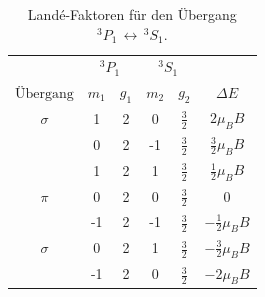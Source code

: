 \begin{table}[h]
        \centering
        \caption{Landé-Faktoren für den Übergang $^{3}P_1 \, \leftrightarrow \, ^{3}S_1$.}
        \label{tab:atab01}
        \begin{tabular}{c c c c c c}
            \toprule
            & \multicolumn{2}{c}{$^{3}P_1 $} & \multicolumn{2}{c}{$^{3}S_1$} \\ %
            \cmidrule(lr){2-3}\cmidrule(lr){4-5}
            {$\text{Übergang}$} & {$m_1$} & {$g_1$} & {$m_2$} & {$g_2$} & {$\Delta E$} \\
            \midrule
            {$\sigma$} & 1 & 2 & 0  & {$\frac{3}{2}$}  & {$2  \mu_B B$} \\
            {}         & 0 & 2 & -1 & {$\frac{3}{2}$}  & {$\frac{3}{2}  \mu_B B$} \\
            \midrule
            {}         & 1  & 2 & 1  & {$\frac{3}{2}$}  & {$\frac{1}{2}  \mu_B B$} \\
            {$\pi$}    & 0  & 2 & 0  & {$\frac{3}{2}$}  & 0 \\
            {}         & -1 & 2 & -1 & {$\frac{3}{2}$}  & {$-\frac{1}{2}  \mu_B B$} \\
            \midrule
            {$\sigma$} & 0  & 2 & 1  & {$\frac{3}{2}$} & {$-\frac{3}{2}  \mu_B B$} \\
            {}         & -1 & 2 & 0  & {$\frac{3}{2}$} & {$-2 \mu_B B$} \\
            \bottomrule
        \end{tabular}
\end{table}
\FloatBarrier
\noindent

